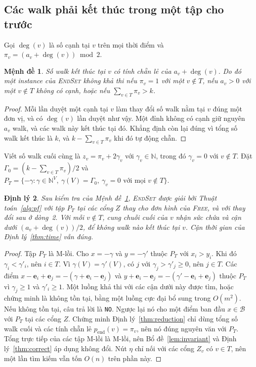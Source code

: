 \documentclass[pdflatex,sn-mathphys-num]{sn-jnl}
\theoremstyle{thmstyleone}%
\newtheorem{theorem}{Định lý}%
\newtheorem{proposition}[theorem]{Mệnh đề}%
\theoremstyle{thmstyletwo}%
\theoremstyle{thmstylethree}%
\newcommand{\N}{\mathbb{N}}
\newcommand{\cB}{\mathcal{B}}
\newcommand{\e}{\mathbf{e}}
\newcommand{\FREE}{\textup{\textsc{Free}}}
\newcommand{\ENDSET}{\textup{\textsc{EndSet}}}
\newcommand{\NO}{\texttt{NO}}
\begin{document}
\subsection{Các walk phải kết thúc trong một tập cho trước}

Gọi $\deg(v)$ là số cạnh tại $v$ trên mọi thời điểm và $\pi_v=(a_v+\deg(v))\bmod 2$.

\begin{proposition}\label{prop:parity}
Số walk kết thúc tại $v$ có tính chẵn lẻ của $a_v+\deg(v)$. Do đó một instance của \ENDSET{} không khả thi nếu $\pi_v=1$ với một $v\notin T$, nếu $a_v>0$ với một $v\notin T$ không có cạnh, hoặc nếu $\sum_{v\in T}\pi_v>k$.
\end{proposition}

\begin{proof}
Mỗi lần duyệt một cạnh tại $v$ làm thay đổi số walk nằm tại $v$ đúng một đơn vị, và có $\deg(v)$ lần duyệt như vậy. Một đỉnh không có cạnh giữ nguyên $a_v$ walk, và các walk này kết thúc tại đó. Khẳng định còn lại đúng vì tổng số walk kết thúc là $k$, và $k-\sum_{v\in T}\pi_v$ khi đó tự động chẵn.
\end{proof}

Viết số walk cuối cùng là $z_v=\pi_v+2\gamma_v$ với $\gamma_v\in\N$, trong đó $\gamma_v=0$ với $v\notin T$. Đặt $\Gamma_0=(k-\sum_{v\in T}\pi_v)/2$ và $P_T=\{-\gamma:\gamma\in\N^V,\ \gamma(V)=\Gamma_0,\ \gamma_v=0 \text{ với mọi } v\notin T\}$.

\begin{theorem}\label{thm:endset}
Sau kiểm tra của Mệnh đề~\ref{prop:parity}, \ENDSET{} được giải bởi Thuật toán~\ref{alg:pf} với tập $P_T$ tại các cổng $Z$ thay cho đơn hình của \FREE{}, và với thay đổi sau ở dòng~2. Với mỗi $v\notin T$, cung chuỗi cuối của $v$ nhận sức chứa và cận dưới $(a_v+\deg(v))/2$, để không walk nào kết thúc tại $v$. Cận thời gian của Định lý~\ref{thm:time} vẫn đúng.
\end{theorem}

\begin{proof}
Tập $P_T$ là M-lồi. Cho $x=-\gamma$ và $y=-\gamma'$ thuộc $P_T$ với $x_i>y_i$. Khi đó $\gamma_i<\gamma'_i$, nên $i\in T$. Vì $\gamma(V)=\gamma'(V)$, có $j$ với $\gamma_j>\gamma'_j\ge0$, nên $j\in T$. Các điểm $x-\e_i+\e_j=-(\gamma+\e_i-\e_j)$ và $y+\e_i-\e_j=-(\gamma'-\e_i+\e_j)$ thuộc $P_T$ vì $\gamma_j\ge1$ và $\gamma'_i\ge1$. Một luồng khả thi với các cận dưới này được tìm, hoặc chứng minh là không tồn tại, bằng một luồng cực đại bổ sung trong $O(m^2)$. Nếu không tồn tại, câu trả lời là \NO{}. Ngược lại nó cho một điểm ban đầu $x\in\cB$ với $P_T$ tại các cổng $Z$. Chứng minh Định lý~\ref{thm:reduction} chỉ dùng tổng số walk cuối và các tính chẵn lẻ $p_{\mathrm{end}}(v)=\pi_v$, nên nó đúng nguyên văn với $P_T$. Tổng trực tiếp của các tập M-lồi là M-lồi, nên Bổ đề~\ref{lem:invariant} và Định lý~\ref{thm:correct} áp dụng không đổi. Nút $\eta$ chỉ nối với các cổng $Z_v$ có $v\in T$, nên một lần tìm kiếm vẫn tốn $O(n)$ trên phần này.
\end{proof}
\end{document}
